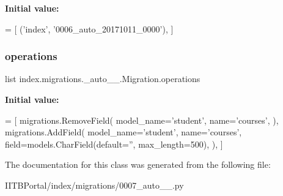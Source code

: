 {\bfseries Initial value\+:}
\begin{DoxyCode}
=  [
        (\textcolor{stringliteral}{'index'}, \textcolor{stringliteral}{'0006\_auto\_20171011\_0000'}),
    ]
\end{DoxyCode}
\mbox{\label{classindex_1_1migrations_1_10007__auto__20171011__1503_1_1Migration_a591384d9981ac500aa4fe5711b9b7965}} 
\subsubsection{\texorpdfstring{operations}{operations}}
{\footnotesize\ttfamily list index.\+migrations.\+\_\+auto\+\_\+\_.\+Migration.\+operations\hspace{0.3cm}{\ttfamily [static]}}

{\bfseries Initial value\+:}
\begin{DoxyCode}
=  [
        migrations.RemoveField(
            model\_name=\textcolor{stringliteral}{'student'},
            name=\textcolor{stringliteral}{'courses'},
        ),
        migrations.AddField(
            model\_name=\textcolor{stringliteral}{'student'},
            name=\textcolor{stringliteral}{'courses'},
            field=models.CharField(default=\textcolor{stringliteral}{''}, max\_length=500),
        ),
    ]
\end{DoxyCode}


The documentation for this class was generated from the following file\+:\begin{DoxyCompactItemize}
\item 
I\+I\+T\+B\+Portal/index/migrations/0007\+\_\+auto\+\_\+\_.\+py\end{DoxyCompactItemize}
